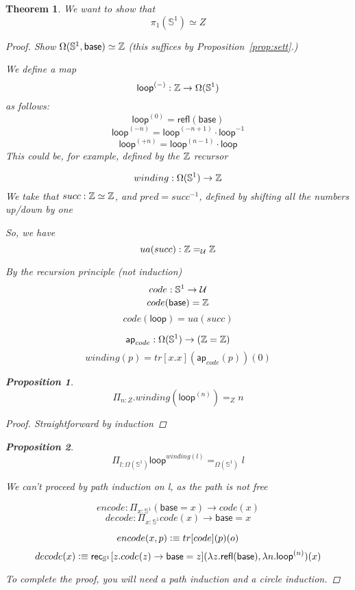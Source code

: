 \documentclass[11pt]{article}
\renewcommand{\SS}{\mathbb{S}}
\renewcommand{\refl}{\mathsf{refl}}
\newcommand {\sbase}{\mathsf{base}}
\newcommand {\sloop}{\mathsf{loop}}
\newcommand*{\ap}{\mathsf{ap}}
\newtheorem{thm}{Theorem}
\newtheorem{proposition}{Proposition}
\begin{document}
\begin{thm}
We want to show that
$$\pi_1(\SS^1) \simeq Z$$
\begin{proof}
Show $\Omega(\SS^1, \sbase) \simeq \Z$ (this suffices by Proposition~\ref{prop:sett}.)

We define a map
$$\sloop^{(-)} : \Z \rightarrow \Omega(\SS^1)$$
as follows:
$$\sloop^{(0)} = \refl(\sbase)$$
$$\sloop^{(-n)} = \sloop^{(-n + 1)} \cdot \sloop^{-1}$$
$$\sloop^{(+n)} = \sloop^{(n - 1)} \cdot \sloop$$
This could be, for example, defined by the $\mathbb{Z}$ recursor

$$winding : \Omega(\SS^{1}) \rightarrow \Z$$
We take that $succ : \mathbb{Z} \simeq \mathbb{Z}$, and $pred = succ^{-1}$, defined by shifting all the numbers up/down by one

So, we have
$$ua(succ) : \mathbb{Z} =_{\mathcal{U}} \mathbb{Z}$$

By the recursion principle (not induction)
$$code : \SS^1 \rightarrow \universe$$
$$code(\sbase) = \Z$$
$$code(\sloop) = ua(succ)$$

$$\ap_{code} : \Omega(\SS^1) \rightarrow (\Z = \Z)$$
$$winding(p) = tr[x.x](\ap_{code}(p))(0)$$
\begin{proposition}
$$\Pi_{n : Z} . winding(\sloop^{(n)}) =_Z n$$
\end{proposition}
\begin{proof}
Straightforward by induction
\end{proof}

\begin{proposition}
$$\Pi_{l : \Omega(\SS^1)} \sloop^{winding(l)} =_{\Omega(\SS^1)} l$$
\end{proposition}

We can't proceed by path induction on l, as the path is not free

$$encode : \Pi_{x : \SS^1} (\sbase = x) \rightarrow code(x)$$
$$decode : \Pi_{x : \SS^1} code(x) \rightarrow \sbase = x$$

$$encode(x,p) \vcentcolon\equiv tr[code](p)(o)$$
$$decode(x) \defeq \rec_{\SS^1}[z.code(z) \rightarrow \sbase = z](\lambda z . \refl(\sbase), \lambda n . \sloop^{(n)})(x)$$

To complete the proof, you will need a path induction and a circle induction.
\end{proof}
\end{thm}
\end{document}
